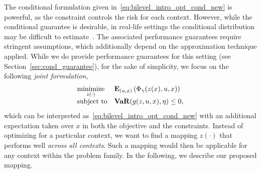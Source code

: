 \documentclass[11pt]{article}
\begin{document}
The conditional formulation given in~\eqref{eq:bilevel_intro_opt_cond_new} is powerful, as the constraint controls the risk for each context. However, while the conditional guarantee is desirable, in real-life settings the conditional distribution may be difficult to estimate~\citep{conformal}. The associated performance guarantees require stringent assumptions, which additionally depend on the approximation technique applied. While we do provide performance guarantees for this setting (see Section~\ref{sec:cond_guarantee}), for the sake of simplicity, we focus on the following {\it joint formulation},
\begin{equation}
	\label{eq:bilevel_intro_opt_cond_joint}
	\begin{array}{ll}
		\underset{z(\cdot)}{\mbox{minimize}} & \mathbf{E}_{(u,x)}\left(\Phi_\gamma(z(x),u,x)\right) \\
		\mbox{subject to} & \mathop{\bf VaR}(g(z,u,x),\eta) \leq 0,\\
	\end{array}
\end{equation}
which can be interpreted as~\eqref{eq:bilevel_intro_opt_cond_new} with an additional expectation taken over $x$ in both the objective and the constraints. Instead of optimizing for a particular context, we want to find a mapping $z(\cdot)$ that performs well {\it across all contexts}. Such a mapping would then be applicable for any context within the problem family.
In the following, we describe our proposed mapping. 
\end{document}
